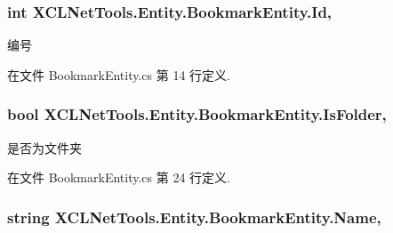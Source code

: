\hypertarget{class_x_c_l_net_tools_1_1_entity_1_1_bookmark_entity_a827314c81aad0801f464f7359509baec}{
\subsubsection[{Id}]{\setlength{\rightskip}{0pt plus 5cm}int X\-C\-L\-Net\-Tools.\-Entity.\-Bookmark\-Entity.\-Id\hspace{0.3cm}{\ttfamily [get]}, {\ttfamily [set]}}}\label{class_x_c_l_net_tools_1_1_entity_1_1_bookmark_entity_a827314c81aad0801f464f7359509baec}


编号 



在文件 Bookmark\-Entity.\-cs 第 14 行定义.

\hypertarget{class_x_c_l_net_tools_1_1_entity_1_1_bookmark_entity_a025f1606c5b38103058567b3e08afe03}{
\subsubsection[{Is\-Folder}]{\setlength{\rightskip}{0pt plus 5cm}bool X\-C\-L\-Net\-Tools.\-Entity.\-Bookmark\-Entity.\-Is\-Folder\hspace{0.3cm}{\ttfamily [get]}, {\ttfamily [set]}}}\label{class_x_c_l_net_tools_1_1_entity_1_1_bookmark_entity_a025f1606c5b38103058567b3e08afe03}


是否为文件夹 



在文件 Bookmark\-Entity.\-cs 第 24 行定义.

\hypertarget{class_x_c_l_net_tools_1_1_entity_1_1_bookmark_entity_a89ccb517e285bfdd17981a72f590bc1c}{
\subsubsection[{Name}]{\setlength{\rightskip}{0pt plus 5cm}string X\-C\-L\-Net\-Tools.\-Entity.\-Bookmark\-Entity.\-Name\hspace{0.3cm}{\ttfamily [get]}, {\ttfamily [set]}}}\label{class_x_c_l_net_tools_1_1_entity_1_1_bookmark_entity_a89ccb517e285bfdd17981a72f590bc1c}


